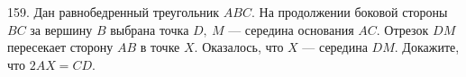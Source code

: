 159. Дан равнобедренный треугольник $ABC.$ На продолжении боковой стороны $BC$ за вершину $B$ выбрана точка $D,\ M$ --- середина основания $AC.$
Отрезок $DM$ пересекает сторону $AB$ в точке $X.$ Оказалось, что $X$ --- середина $DM.$ Докажите, что $2AX = CD.$
\newpage
